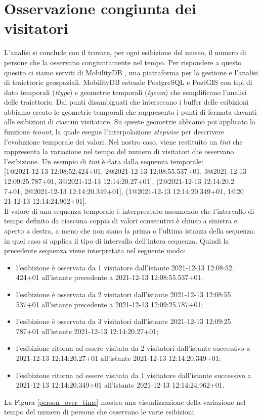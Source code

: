\documentclass[12pt]{article}
\begin{document}
\section{Osservazione congiunta dei visitatori}
L'analisi si conclude con il trovare, per ogni esibizione del museo, il numero di persone che la osservano congiuntamente nel tempo.
Per rispondere a questo quesito ci siamo serviti di MobilityDB \cite{MobilityDBTODS2020}, una piattaforma per la gestione e l'analisi di traiettorie geospaziali.
MobilityDB estende PostgreSQL e PostGIS con tipi di dato temporali (\emph{ttype}) e geometrie temporali (\emph{tgeom}) che semplificano l'analisi delle traiettorie.
Dai punti disambiguati che intersecano i buffer delle esibizioni abbiamo creato le geometrie temporali che rappresento i punti di fermata davanti alle esibizioni di ciascun visitatore.
Su queste geometrie abbiamo poi applicato la funzione \emph{tcount}, la quale esegue l'interpolazione \emph{stepwise} per descrivere l'evoluzione temporale dei valori.
Nel nostro caso, viene restituito un \emph{tint} che rappresenta la variazione nel tempo del numero di visitatori che osservano l'esibizione.
Un esempio di \emph{tint} è data dalla sequenza temporale: \\
{[1@2021-12-13 12:08:52.424+01, 2@2021-12-13 12:08:55.537+01, 3@2021-12-13 12:09:25.787+01, 3@2021-12-13 12:14:20.27+01], (2@2021-12-13 12:14:20.2\\7+01, 2@2021-12-13 12:14:20.349+01], (1@2021-12-13 12:14:20.349+01, 1@20\\21-12-13 12:14:24.962+01]}.\\
Il valore di una sequenza temporale è interpreatato assumendo che l'intervallo di tempo definito da ciascuna coppia di valori consecutivi è chiuso a sinistra e aperto a destra, a meno che non siano la prima o l'ultima istanza della sequenza: in quel caso si applica il tipo di intervallo dell'intera sequenza.
Quindi la precedente sequenza viene interpretata nel seguente modo:
\begin{itemize}
    \item l'esibizione è osservata da 1 visitatore dall'istante 2021-12-13 12:08:52.\\424+01 all'istante precedente a 2021-12-13 12:08:55.537+01;
    \item l'esibizione è osservata da 2 visitatori dall'istante 2021-12-13 12:08:55.\\537+01 all'istante precedente a 2021-12-13 12:09:25.787+01;
    \item l'esibizione è osservata da 3 visitatori dall'istante 2021-12-13 12:09:25.\\787+01 all'istante 2021-12-13 12:14:20.27+01;
    \item l'esibizione ritorna ad essere visitata da 2 visitatori dall'istante successivo a 2021-12-13 12:14:20.27+01 all'istante 2021-12-13 12:14:20.349+01;
    \item l'esibizione ritorna ad essere visitata da 1 visitatore dall'istante successivo a 2021-12-13 12:14:20.349+01 all'istante 2021-12-13 12:14:24.962+01.
\end{itemize}
La Figura \ref{person_over_time} mostra una visualizzazione della variazione nel tempo del numero di persone che osservano le varie esibizioni. 
\end{document}
